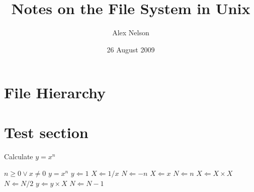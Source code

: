 \documentclass{amsart}
\title{Notes on the File System in Unix}
\author{Alex Nelson}
\date{26 August 2009}
\numberwithin{algorithm}{section}
\begin{document}
\maketitle
\tableofcontents

\section{File Hierarchy}


\section{Test section}
\begin{algorithm}                      %
\caption{Calculate $y = x^n$}          %
\label{alg1}                           %
\begin{algorithmic}                    %
\REQUIRE $n \geq 0 \vee x \neq 0$
\ENSURE $y = x^n$
\STATE $y \Leftarrow 1$
\STATE $X \Leftarrow 1 / x$
\STATE $N \Leftarrow -n$
\ELSE
\STATE $X \Leftarrow x$
\STATE $N \Leftarrow n$
\ENDIF
{}
\STATE $X \Leftarrow X \times X$
\STATE $N \Leftarrow N / 2$
\ELSE[$N$ is odd]
\STATE $y \Leftarrow y \times X$
\STATE $N \Leftarrow N - 1$
\ENDIF
\ENDWHILE
\end{algorithmic}
\end{algorithm}



\nocite{*}


\end{document}
